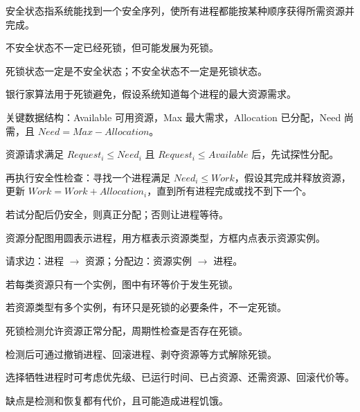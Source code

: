 \begin{points}
  \item 安全状态指系统能找到一个安全序列，使所有进程都能按某种顺序获得所需资源并完成。
  \item 不安全状态不一定已经死锁，但可能发展为死锁。
  \item 死锁状态一定是不安全状态；不安全状态不一定是死锁状态。
\end{points}


\begin{points}
  \item 银行家算法用于死锁避免，假设系统知道每个进程的最大资源需求。
  \item 关键数据结构：Available 可用资源，Max 最大需求，Allocation 已分配，Need 尚需，且 $Need=Max-Allocation$。
  \item 资源请求满足 $Request_i\le Need_i$ 且 $Request_i\le Available$ 后，先试探性分配。
  \item 再执行安全性检查：寻找一个进程满足 $Need_i\le Work$，假设其完成并释放资源，更新 $Work=Work+Allocation_i$，直到所有进程完成或找不到下一个。
  \item 若试分配后仍安全，则真正分配；否则让进程等待。
\end{points}


\begin{points}
  \item 资源分配图用圆表示进程，用方框表示资源类型，方框内点表示资源实例。
  \item 请求边：进程 $\rightarrow$ 资源；分配边：资源实例 $\rightarrow$ 进程。
  \item 若每类资源只有一个实例，图中有环等价于发生死锁。
  \item 若资源类型有多个实例，有环只是死锁的必要条件，不一定死锁。
\end{points}


\begin{points}
  \item 死锁检测允许资源正常分配，周期性检查是否存在死锁。
  \item 检测后可通过撤销进程、回滚进程、剥夺资源等方式解除死锁。
  \item 选择牺牲进程时可考虑优先级、已运行时间、已占资源、还需资源、回滚代价等。
  \item 缺点是检测和恢复都有代价，且可能造成进程饥饿。
\end{points}


